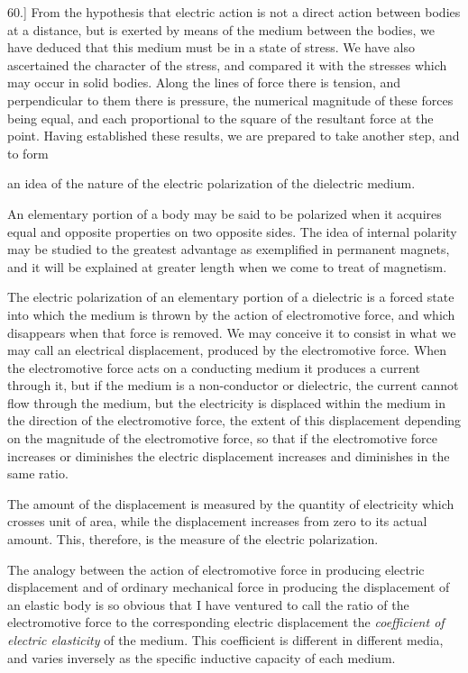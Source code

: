 \documentclass[11pt,a4paper]{article}
\begin{document}
60.] From the hypothesis that electric action is not a direct
action between bodies at a distance, but is exerted by means of
the medium between the bodies, we have deduced that this medium
must be in a state of stress. We have also ascertained the character
of the stress, and compared it with the stresses which may occur
in solid bodies. Along the lines of force there is tension, and
perpendicular to them there is pressure, the numerical magnitude
of these forces being equal, and each proportional to the square
of the resultant force at the point. Having established these
results, we are prepared to take another step, and to form


an idea of the nature of the electric polarization of the dielectric
medium.

An elementary portion of a body may be said to be polarized
when it acquires equal and opposite properties on two opposite
sides. The idea of internal polarity may be studied to the greatest
advantage as exemplified in permanent magnets, and it will be
explained at greater length when we come to treat of magnetism.

The electric polarization of an elementary portion of a dielectric
is a forced state into which the medium is thrown by the action
of electromotive force, and which disappears when that force is
removed. We may conceive it to consist in what we may call
an electrical displacement, produced by the electromotive force.
When the electromotive force acts on a conducting medium it
produces a current through it, but if the medium is a non-conductor
or dielectric, the current cannot flow through the medium, but the
electricity is displaced within the medium in the direction of the
electromotive force, the extent of this displacement depending on
the magnitude of the electromotive force, so that if the electromotive
force increases or diminishes the electric displacement increases
and diminishes in the same ratio.

The amount of the displacement is measured by the quantity of
electricity which crosses unit of area, while the displacement increases
from zero to its actual amount. This, therefore, is the measure of
the electric polarization.

The analogy between the action of electromotive force in producing
electric displacement and of ordinary mechanical force in producing
the displacement of an elastic body is so obvious that I have ventured
to call the ratio of the electromotive force to the corresponding
electric displacement the \textit{coefficient of electric elasticity} of the
medium. This coefficient is different in different media, and varies
inversely as the specific inductive capacity of each medium.
\end{document}
